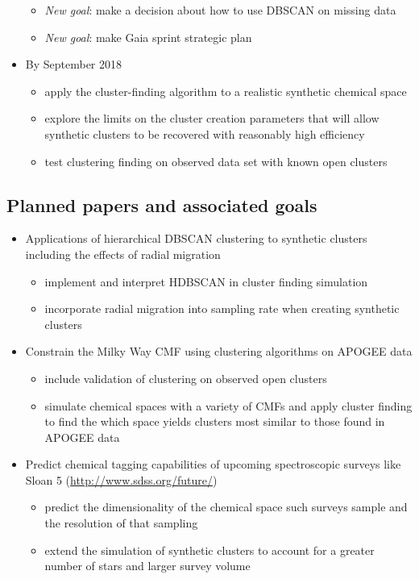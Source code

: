 \documentclass[11pt]{article}
\begin{document}
\begin{itemize}
\begin{itemize}
\item \emph{New goal}: {\color{ForestGreen} make a decision about how to use DBSCAN on missing data}
\item \emph{New goal}: {\color{RoyalBlue} make Gaia sprint strategic plan}
\end{itemize}
\item By September 2018
\begin{itemize}
\item {\color{RoyalBlue}apply the cluster-finding algorithm to a realistic synthetic chemical space} 
\item {\color{ForestGreen} explore the limits on the cluster creation parameters that will allow synthetic clusters to be recovered with reasonably high efficiency}
\item test clustering finding on observed data set with known open clusters
\end{itemize}
\end{itemize}

\subsection*{Planned papers and associated goals}
\begin{itemize}
	\item Applications of hierarchical DBSCAN clustering to synthetic clusters including the effects of radial migration
	\begin{itemize}
	\item implement and interpret HDBSCAN in cluster finding simulation
	\item incorporate radial migration into sampling rate when creating synthetic clusters
	\end{itemize}
	\item Constrain the Milky Way CMF using clustering algorithms on APOGEE data
	\begin{itemize}
	\item include validation of clustering on observed open clusters
	\item simulate chemical spaces with a variety of CMFs and apply cluster finding to find the which space yields clusters most similar to those found in APOGEE data
	\end{itemize}
	\item Predict chemical tagging capabilities of upcoming spectroscopic surveys like Sloan 5 (\url{http://www.sdss.org/future/})
	\begin{itemize}
	\item predict the dimensionality of the chemical space such surveys sample and the resolution of that sampling
	\item extend the simulation of synthetic clusters to account for a greater number of stars and larger survey volume
	\end{itemize}
\end{itemize}

\end{document}
